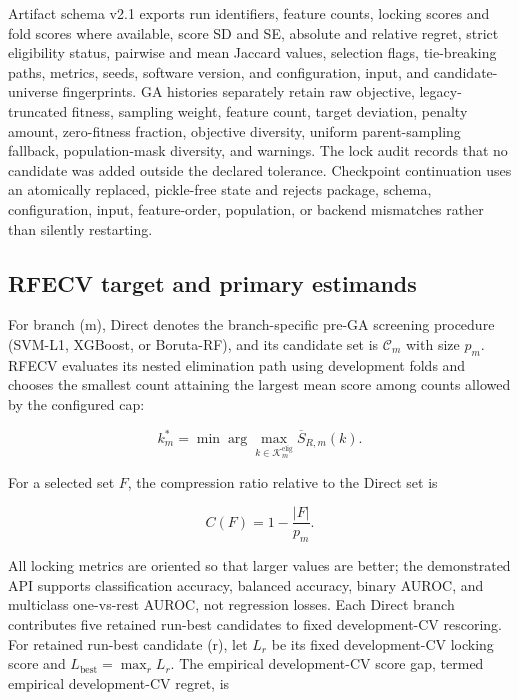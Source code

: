 Artifact schema v2.1 exports run identifiers, feature counts, locking scores and fold scores where available, score SD and SE, absolute and relative regret, strict eligibility status, pairwise and mean Jaccard values, selection flags, tie-breaking paths, metrics, seeds, software version, and configuration, input, and candidate-universe fingerprints. GA histories separately retain raw objective, legacy-truncated fitness, sampling weight, feature count, target deviation, penalty amount, zero-fitness fraction, objective diversity, uniform parent-sampling fallback, population-mask diversity, and warnings. The lock audit records that no candidate was added outside the declared tolerance. Checkpoint continuation uses an atomically replaced, pickle-free state and rejects package, schema, configuration, input, feature-order, population, or backend mismatches rather than silently restarting.

\subsection{RFECV target and primary estimands}

For branch (m), Direct denotes the branch-specific pre-GA screening procedure (SVM-L1, XGBoost, or Boruta-RF), and its candidate set is \(\mathcal C_m\) with size \(p_m\). RFECV evaluates its nested elimination path using development folds and chooses the smallest count attaining the largest mean score among counts allowed by the configured cap:

\begin{equation}
k_m^{\ast}=\min\!\arg\max_{k\in\mathcal K_m^{\mathrm{elig}}}\overline S_{R,m}(k).
\label{eq:rfecv-target}
\end{equation}

For a selected set \(F\), the compression ratio relative to the Direct set is

\begin{equation}
C(F)=1-\frac{|F|}{p_m}.
\label{eq:compression}
\end{equation}

All locking metrics are oriented so that larger values are better; the demonstrated API supports classification accuracy, balanced accuracy, binary AUROC, and multiclass one-vs-rest AUROC, not regression losses. Each Direct branch contributes five retained run-best candidates to fixed development-CV rescoring. For retained run-best candidate (r), let \(L_r\) be its fixed development-CV locking score and \(L_{\mathrm{best}}=\max_r L_r\). The empirical development-CV score gap, termed empirical development-CV regret, is

